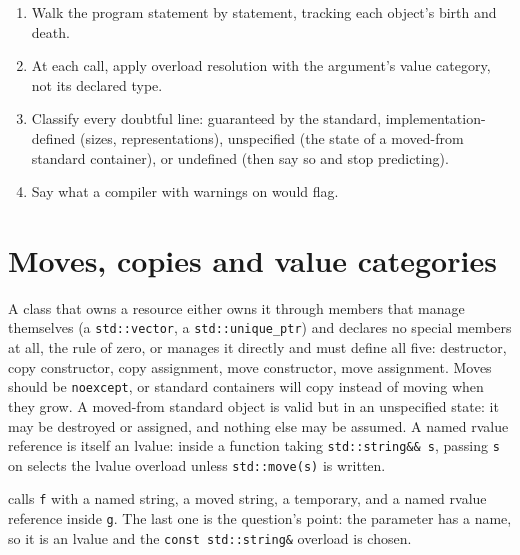 \begin{method}\label{met:iv:cpp:output}
\begin{enumerate}
\item Walk the program statement by statement, tracking each object's birth and death.
\item At each call, apply overload resolution with the argument's value category, not its declared type.
\item Classify every doubtful line: guaranteed by the standard, implementation-defined (sizes, representations), unspecified
(the state of a moved-from standard container), or undefined (then say so and stop predicting).
\item Say what a compiler with warnings on would flag.
\end{enumerate}
\end{method}

\section{Moves, copies and value categories}

A class that owns a resource either owns it through members that manage themselves (a \texttt{std::vector}, a
\texttt{std::unique\_ptr}) and declares no special members at all, the rule of zero, or manages it directly and must define
all five: destructor, copy constructor, copy assignment, move constructor, move assignment. Moves should be \texttt{noexcept},
or standard containers will copy instead of moving when they grow. A moved-from standard object is valid but in an unspecified
state: it may be destroyed or assigned, and nothing else may be assumed. A named rvalue reference is itself an lvalue: inside a
function taking \texttt{std::string\&\& s}, passing \texttt{s} on selects the lvalue overload unless \texttt{std::move(s)} is
written.

\begin{example}\label{ex:iv:cpp:overload}
 calls \texttt{f} with a named string, a moved string, a temporary, and a named rvalue reference
inside \texttt{g}. The last one is the question's point: the parameter has a name, so it is an lvalue and the
\texttt{const std::string\&} overload is chosen.
\end{example}

\label{lst:iv:cpp:overload}

